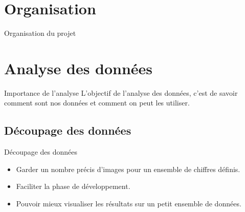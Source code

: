 \documentclass[10pt,handout]{beamer}
\begin{document}
\section{Organisation}
\begin{frame}{Organisation du projet}
    
\end{frame}

\section{Analyse des données}
\begin{frame}
    \begin{block}{Importance de l'analyse}
        L'objectif de l'analyse des données, c'est de savoir comment sont nos données et comment on peut les utiliser.
    \end{block}
\end{frame}


\subsection{Découpage des données}

\begin{frame}{Découpage des données}
    \begin{itemize}
        \item Garder un nombre précis d’images pour un ensemble de chiffres définis.
        \item Faciliter la phase de développement.
        \item Pouvoir mieux visualiser les résultats sur un petit
        ensemble de données.
    \end{itemize}
\end{frame}
\end{document}

